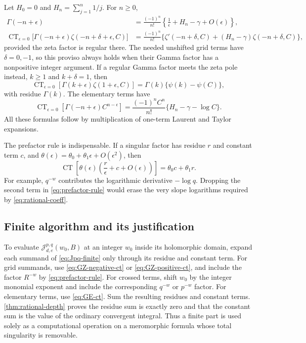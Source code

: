 \documentclass[11pt,a4paper]{article}
\theoremstyle{definition}
\numberwithin{equation}{section}
\newcommand{\CT}{\operatorname{CT}}
\begin{document}
Let $H_0=0$ and $H_n=\sum_{j=1}^n1/j$. For $n\ge0$,
\begin{align}
 \Gamma(-n+\epsilon)
  &=\frac{(-1)^n}{n!}
     \left\{\frac1\epsilon+H_n-\gamma+O(\epsilon)\right\},
                                 \label{eq:Gamma-laurent}\\
 \CT_{\epsilon=0}\bigl[\Gamma(-n+\epsilon)
                    \zeta(-n+\delta+\epsilon,C)\bigr]
  &=\frac{(-1)^n}{n!}
    \{\zeta'(-n+\delta,C)+(H_n-\gamma)\zeta(-n+\delta,C)\},
                                 \label{eq:GZ-negative-ct}
\end{align}
provided the zeta factor is regular there. The needed unshifted grid
terms have $\delta=0,-1$, so this proviso always holds when their Gamma
factor has a nonpositive integer argument. If a regular Gamma factor
meets the zeta pole instead, $k\ge1$ and $k+\delta=1$, then
\begin{equation}\label{eq:GZ-positive-ct}
 \CT_{\epsilon=0}[\Gamma(k+\epsilon)\zeta(1+\epsilon,C)]
       =\Gamma(k)\{\psi(k)-\psi(C)\},
\end{equation}
with residue $\Gamma(k)$. The elementary terms have
\begin{equation}\label{eq:GE-ct}
 \CT_{\epsilon=0}[\Gamma(-n+\epsilon)C^{n-\epsilon}]
       =\frac{(-1)^nC^n}{n!}\{H_n-\gamma-\log C\}.
\end{equation}
All these formulas follow by multiplication of one-term Laurent and
Taylor expansions.

The prefactor rule is indispensable. If a singular factor has residue
$r$ and constant term $c$, and
$\theta(\epsilon)=\theta_0+\theta_1\epsilon+O(\epsilon^2)$, then
\begin{equation}\label{eq:prefactor-rule}
 \CT\left[\theta(\epsilon)\left(\frac r\epsilon+c+O(\epsilon)\right)\right]
        =\theta_0c+\theta_1r.
\end{equation}
For example, $q^{-w}$ contributes the logarithmic derivative $-\log q$.
Dropping the second term in \eqref{eq:prefactor-rule} would erase the
very slope logarithms required by \eqref{eq:rational-coeff}.

\subsection{Finite algorithm and its justification}
To evaluate $\mathcal J_{d,e}^{p,q}(w_0,B)$ at an integer $w_0$ inside its
holomorphic domain, expand each summand of \eqref{eq:Jpq-finite} only
through its residue and constant term. For grid summands, use
\eqref{eq:GZ-negative-ct} or \eqref{eq:GZ-positive-ct}, and include the
factor $R^{-w}$ by \eqref{eq:prefactor-rule}. For crossed terms, shift
$w_0$ by the integer monomial exponent and include the corresponding
$q^{-w}$ or $p^{-w}$ factor. For elementary terms, use
\eqref{eq:GE-ct}. Sum the resulting residues and constant terms.
\cref{thm:rational-depth} proves the residue sum is exactly zero and
that the constant sum is the value of the ordinary convergent integral.
Thus a finite part is used solely as a computational operation on a
meromorphic formula whose total singularity is removable.
\end{document}
